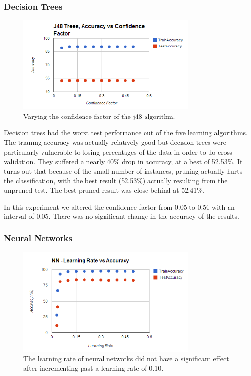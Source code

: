 \documentclass[annual]{acmsiggraph}
\begin{document}
\subsubsection{Decision Trees}

\begin{figure}[ht]
  \centering
  \includegraphics[width=3.5in]{charts/chart_1_j48_d2.PNG}
  \caption{Varying the confidence factor of the j48 algorithm.}
  \label{fig:j481d2}
\end{figure}

Decision trees had the worst test performance out of the five learning algorithms.
The trianing accuracy was actually relatively good but decision trees were particularly
vulnerable to losing percentages of the data in order to do cross-validation. They
suffered a nearly 40\% drop in accuracy, at a best of 52.53\%. It turns out that
because of the small number of instances, pruning actually hurts the classification,
with the best result (52.53\%) actually resulting from the unpruned test. The best
pruned result was close behind at 52.41\%.

In this experiment we altered the confidence factor from 0.05 to 0.50 with an
interval of 0.05. There was no significant change in the accuracy of the results. 

\subsubsection{Neural Networks}

\begin{figure}[ht]
  \centering
  \includegraphics[width=3.5in]{charts/chart_1_nn_d2.PNG}
  \caption{The learning rate of neural networks did not have a significant
  effect after incrementing past a learning rate of 0.10.}
  \label{fig:nn1d2}
\end{figure}
\end{document}

